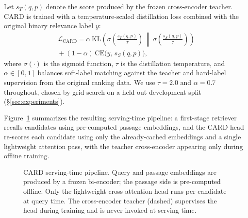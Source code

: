 Let $s_T(q,p)$ denote the score produced by the frozen cross-encoder teacher.
CARD is trained with a temperature-scaled distillation loss combined with the
original binary relevance label $y$:
\begin{multline}
\mathcal{L}_{\text{CARD}} = \alpha \, \mathrm{KL}\!\left(\sigma\!\left(\frac{s_T(q,p)}{\tau}\right)
\,\middle\|\, \sigma\!\left(\frac{s_S(q,p)}{\tau}\right)\right) \\
{}+ (1-\alpha)\,\mathrm{CE}\big(y,\, s_S(q,p)\big),
\label{eq:distill}
\end{multline}
where $\sigma(\cdot)$ is the sigmoid function, $\tau$ is the distillation
temperature, and $\alpha \in [0,1]$ balances soft-label matching against the
teacher and hard-label supervision from the original ranking data. We use
$\tau = 2.0$ and $\alpha = 0.7$ throughout, chosen by grid search on a held-out
development split (\S\ref{sec:experiments}).

Figure~\ref{fig:pipeline} summarizes the resulting serving-time pipeline: a
first-stage retriever recalls candidates using pre-computed passage
embeddings, and the CARD head re-scores each candidate using only the
already-cached embeddings and a single lightweight attention pass, with the
teacher cross-encoder appearing only during offline training.

\begin{figure}[t]
\centering
{}
\caption{CARD serving-time pipeline. Query and passage embeddings are
produced by a frozen bi-encoder; the passage side is pre-computed offline.
Only the lightweight cross-attention head runs per candidate at query time.
The cross-encoder teacher (dashed) supervises the head during training and
is never invoked at serving time.}
\label{fig:pipeline}
\end{figure}
